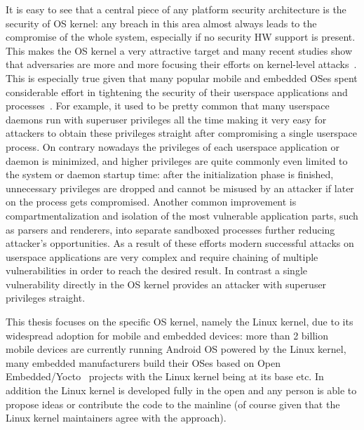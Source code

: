 It is easy to see that a central piece of any platform security architecture is the security of OS kernel: any breach in this area almost always leads to the compromise of the whole system, especially if no security HW support is present. This makes the OS kernel a very attractive target and many recent studies show that adversaries are more and more focusing their efforts on kernel-level attacks~\cite{stoep2016android}. This is especially true given that many popular mobile and embedded OSes spent considerable effort in tightening the security of their userspace applications and processes~\cite{stoep2016android}. For example, it used to be pretty common that many userspace daemons run with superuser privileges all the time making it very easy for attackers to obtain these privileges straight after compromising a single userspace process. On contrary nowadays the privileges of each userspace application or daemon is minimized, and higher privileges are quite commonly even limited to the system or daemon startup time: after the initialization phase is finished, unnecessary privileges are dropped and cannot be misused by an attacker if later on the process gets compromised. Another common improvement is compartmentalization and isolation of the most vulnerable application parts, such as parsers and renderers, into separate sandboxed processes further reducing attacker's opportunities. As a result of these efforts modern successful attacks on userspace applications are very complex and require chaining of multiple vulnerabilities in order to reach the desired result. In contrast a single vulnerability directly in the OS kernel provides an attacker with superuser privileges straight.

This thesis focuses on the specific OS kernel, namely the Linux kernel, due to its widespread adoption for mobile and embedded devices: more than 2 billion mobile devices are currently running Android OS powered by the Linux kernel, many embedded manufacturers build their OSes based on Open Embedded/Yocto~\cite{OE2017, yocto2017} projects with the Linux kernel being at its base etc. 
In addition the Linux kernel is developed fully in the open and any person is able to propose ideas or contribute the code to the mainline (of course given that the Linux kernel maintainers agree with the approach).

